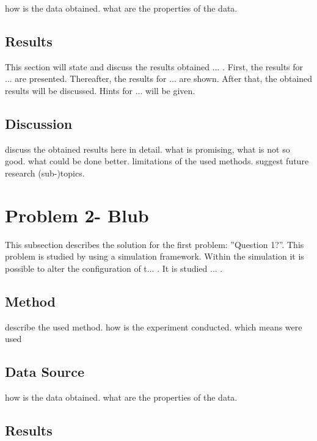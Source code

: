 how is the data obtained. what are the properties of the data.


\subsection{Results}
\label{ss:results}

This section will state and discuss the results obtained ... . First, the results for ... are presented. Thereafter, the results for ... are shown. After that, the obtained results will be discussed. Hints for ... will be given.




\subsection{Discussion}
\label{ss:discussion_details}

discuss the obtained results here in detail. what is promising, what is not so good. what could be done better. limitations of the used methods. suggest future research (sub-)topics.







\section{Problem 2- Blub}
\label{s:solution_prob_2}

This subsection describes the solution for the first problem: ''Question 1?''. This problem is studied by using a simulation framework. Within the simulation it is possible to alter the configuration of t... . It is studied ... .



\subsection{Method}
\label{ss:method2}

describe the used method. how is the experiment conducted. which means were used

\subsection{Data Source}
\label{ss:datasource2}

how is the data obtained. what are the properties of the data.


\subsection{Results}
\label{ss:results2}

